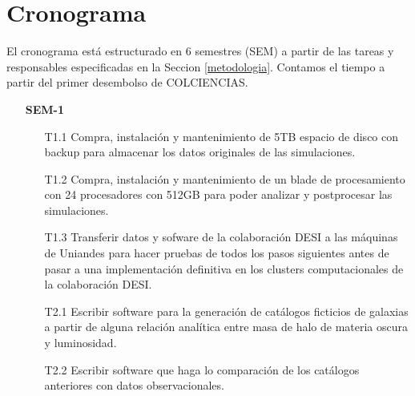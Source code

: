 \section{Cronograma}
\label{cronograma}

El cronograma est\'a estructurado en 6 semestres (SEM) a partir de las tareas y
responsables especificadas en la Seccion \ref{metodologia}.  Contamos
el tiempo a partir del primer desembolso de COLCIENCIAS. 

\begin{itemize}
\item[\bf SEM-1]
\begin{itemize}

\item[T1.1] \tecn 
Compra, instalaci\'on y mantenimiento de 5TB espacio de disco
  con backup para almacenar los datos originales de las simulaciones.
\item[T1.2] \tecn 
  Compra, instalaci\'on y mantenimiento de un blade de
  procesamiento con 24 procesadores con 512GB para poder analizar y
  postprocesar las simulaciones.
\item[T1.3] \tecn\prof 
  Transferir datos y sofware de la colaboraci\'on
  DESI a las m\'aquinas de Uniandes para hacer pruebas de todos los
  pasos siguientes antes de pasar a una implementaci\'on definitiva en
  los clusters computacionales de la colaboraci\'on DESI. 
\item[T2.1] \gradA\prof 
  Escribir software para la generaci\'on de cat\'alogos
  ficticios de galaxias a partir de alguna relaci\'on anal\'itica
  entre masa de halo de materia oscura y luminosidad.
\item[T2.2] \gradA\prof 
  Escribir software que haga lo comparaci\'on de los cat\'alogos
  anteriores con datos observacionales.
\end{itemize}




\end{itemize}

